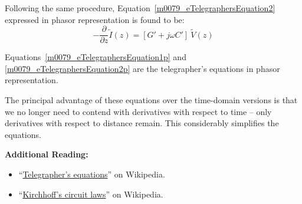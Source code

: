 %
Following the same procedure, Equation~\ref{m0079_eTelegraphersEquation2} expressed in phasor representation is found to be:
%
\begin{equation}
\boxed{
-\frac{\partial}{\partial z} \widetilde{I}(z) = \left[ G' + j\omega C' \right]~\widetilde{V}(z)
}
\label{m0079_eTelegraphersEquation2p}
\end{equation}
%
\begin{mdframed}[backgroundcolor=yellow!20,nobreak=true] 
Equations~\ref{m0079_eTelegraphersEquation1p} and \ref{m0079_eTelegraphersEquation2p} are the telegrapher's equations in phasor representation. 
\end{mdframed}
%
The principal advantage of these equations over the time-domain versions is that we no longer need to contend with derivatives with respect to time -- only derivatives with respect to distance remain.
This considerably simplifies the equations.


{\bf Additional Reading:}
\begin{itemize}
\item ``\href{https://en.wikipedia.org/wiki/Telegrapher's_equations}{Telegrapher's equations}'' on Wikipedia.
\item ``\href{https://en.wikipedia.org/wiki/Kirchhoff's_circuit_laws}{Kirchhoff's circuit laws}'' on Wikipedia.
\end{itemize}





